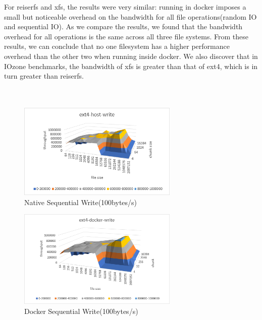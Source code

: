 \documentclass[letterpaper,twocolumn,10pt]{article}
\begin{document}
For reiserfs and xfs, the results were very similar: running in docker imposes a small but noticeable overhead on the bandwidth for all file operations(random IO and sequential IO). As we compare the results, we found that the bandwidth overhead for all operations is the same across all three file systems. From these results, we can conclude that no one filesystem has a higher performance overhead than the other two when running inside docker. We also discover that in IOzone benchmarks, the bandwidth of xfs is greater than that of ext4, which is in turn greater than reiserfs.\\

\noindent{}
\\\\



\begin{figure}[!ht]
\centering
\includegraphics[width=3in]{../results/ext4-host-write.png}
\caption{Native Sequential Write(100bytes/s)}
\label{fig:ext4-host-write}
\end{figure}

\begin{figure}[!ht]
\centering
\includegraphics[width=3in]{../results/ext4-docker-write.png}
\caption{Docker Sequential Write(100bytes/s)}
\label{fig:ext4-docker-write}
\end{figure}
\end{document}
